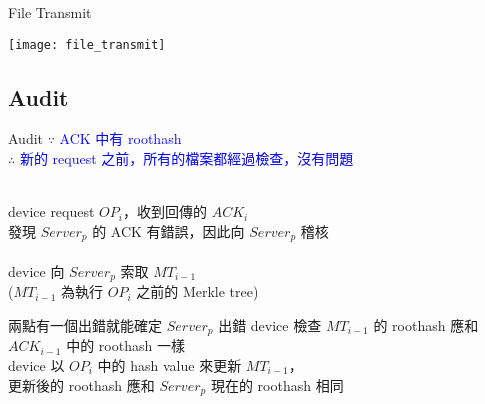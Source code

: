 \begin{frame}{File Transmit}
	\begin{center}
		\texttt{[image: file\_transmit]}
	\end{center}
\end{frame}

\subsection{Audit}
\begin{frame}{Audit}
	\textcolor{blue}{$\because$ ACK 中有 roothash\\
	$\therefore$ 新的 request 之前，所有的檔案都經過檢查，沒有問題}\\
	~\\	
	\begin{block}{}
		\centering
		device request $OP_i$，收到回傳的 $ACK_i$\\
		發現 $Server_p$ 的 ACK 有錯誤，因此向 $Server_p$ 稽核\\
		~\\
		device 向 $Server_p$ 索取 $MT_{i-1}$\\
		($MT_{i-1}$ 為執行 $OP_i$ 之前的 Merkle tree)
	\end{block}
	\begin{alertblock}{ 兩點有一個出錯就能確定 $Server_p$ 出錯}
		 device 檢查 $MT_{i-1}$ 的 roothash 應和 $ACK_{i-1}$ 中的 roothash 一樣\\
		 device 以 $OP_i$ 中的 hash value 來更新 $MT_{i-1}$，\\
		\tab{}更新後的 roothash 應和 $Server_p$ 現在的 roothash 相同
	\end{alertblock}	
\end{frame}